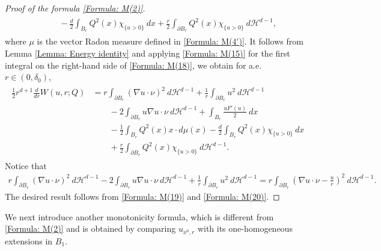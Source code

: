 \documentclass[11pt,reqno]{amsart}
\begin{document}
\begin{proof}[Proof of the formula \eqref{Formula: M(2)}]
\begin{align}
\begin{alignedat}{3}
    		&\qquad-\frac{d}{2}\int_{B_{r}}Q^{2}(x)\chi_{\{u>0\}}\:dx+\frac{r}{2}\int_{\partial B_{r}}Q^{2}(x)\chi_{\{u>0\}}\:d\mathcal{H}^{d-1},
    	\end{alignedat}
    \end{align}
    where $\mu$ is the vector Radon measure defined in \eqref{Formula: M(4')}. It follows from Lemma \ref{Lemma: Energy identity} and applying \eqref{Formula: M(15)} for the first integral on the right-hand side of \eqref{Formula: M(18)}, we obtain for a.e. $r\in(0,\delta_{0})$,
    \begin{align}\label{Formula: M(19)}
    	\begin{alignedat}{4}
    		\frac{1}{2}r^{d+1}\frac{d}{dr}W(u,r;Q)&=r\int_{\partial B_{r}}(\nabla u\cdot\nu)^{2}\:d\mathcal{H}^{d-1}+\frac{1}{r}\int_{\partial B_{r}}u^{2}\:d\mathcal{H}^{d-1}\\
    		&\qquad-2\int_{\partial B_{r}}u\nabla u\cdot\nu\:d\mathcal{H}^{d-1}+\int_{B_{r}}\frac{uF'(u)}{2}\:dx\\
    		&\qquad-\frac{1}{2}\int_{B_{r}}Q^{2}(x)x\cdot d\mu(x)-\frac{d}{2}\int_{B_{r}}Q^{2}(x)\chi_{\{u>0\}}\:dx\\
    		&\qquad+\frac{r}{2}\int_{\partial B_{r}}Q^{2}(x)\chi_{\{u>0\}}\:d\mathcal{H}^{d-1}.
    	\end{alignedat}
    \end{align}
    Notice that
    \begin{align}\label{Formula: M(20)}
    	r\int_{\partial B_{r}}(\nabla u\cdot\nu)^{2}\:d\mathcal{H}^{d-1}-2\int_{\partial B_{r}}u\nabla u\cdot\nu\:d\mathcal{H}^{d-1}+\frac{1}{r}\int_{\partial B_{r}}u^{2}\:d\mathcal{H}^{d-1}=r\int_{\partial B_{r}}\left(\nabla u\cdot\nu-\frac{u}{r}\right)^{2}\:d\mathcal{H}^{d-1}.
    \end{align}
    The desired result follows from \eqref{Formula: M(19)} and \eqref{Formula: M(20)}.
\end{proof}
We next introduce another monotonicity formula, which is different from \eqref{Formula: M(2)} and is obtained by comparing $u_{x^{0},r}$ with its one-homogeneous extensions in $B_{1}$.
\end{document}
